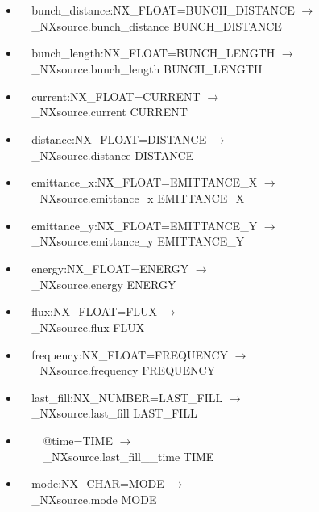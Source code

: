 \documentclass[11pt]{article}
\begin{document}
{{\begin{itemize}
\item{\verb|  |bunch\_distance:NX\_FLOAT=BUNCH\_DISTANCE $\rightarrow$\\
\verb|  |\_NXsource.bunch\_distance BUNCH\_DISTANCE}

\item{\verb|  |bunch\_length:NX\_FLOAT=BUNCH\_LENGTH $\rightarrow$\\
\verb|  |\_NXsource.bunch\_length BUNCH\_LENGTH}

\item{\verb|  |current:NX\_FLOAT=CURRENT $\rightarrow$\\
\verb|  |\_NXsource.current CURRENT}

\item{\verb|  |distance:NX\_FLOAT=DISTANCE $\rightarrow$\\
\verb|  |\_NXsource.distance DISTANCE}

\item{\verb|  |emittance\_x:NX\_FLOAT=EMITTANCE\_X $\rightarrow$\\
\verb|  |\_NXsource.emittance\_x EMITTANCE\_X}

\item{\verb|  |emittance\_y:NX\_FLOAT=EMITTANCE\_Y $\rightarrow$\\
\verb|  |\_NXsource.emittance\_y EMITTANCE\_Y}

\item{\verb|  |energy:NX\_FLOAT=ENERGY $\rightarrow$\\
\verb|  |\_NXsource.energy ENERGY}

\item{\verb|  |flux:NX\_FLOAT=FLUX $\rightarrow$\\
\verb|  |\_NXsource.flux FLUX}

\item{\verb|  |frequency:NX\_FLOAT=FREQUENCY $\rightarrow$\\
\verb|  |\_NXsource.frequency FREQUENCY}

\item{\verb|  |last\_fill:NX\_NUMBER=LAST\_FILL $\rightarrow$\\
\verb|  |\_NXsource.last\_fill LAST\_FILL}

\item{\verb|    |@time=TIME $\rightarrow$\\
\verb|    |\_NXsource.last\_fill\_\_time TIME}

\item{\verb|  |mode:NX\_CHAR=MODE $\rightarrow$\\
\verb|  |\_NXsource.mode MODE}


\end{itemize}}}
\end{document}
